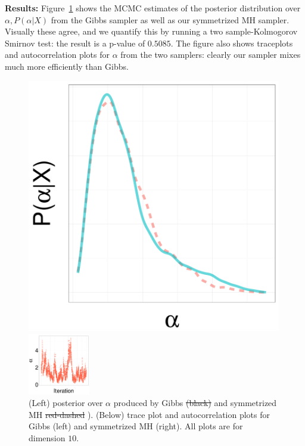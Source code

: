 \noindent \textbf{Results:}
Figure~\ref{fig:TRACE_EXP} shows the MCMC estimates of the posterior distribution over $\alpha, P(\alpha|X)$ from the Gibbs sampler as well as our symmetrized MH sampler. Visually these agree, and we quantify this by running a two sample-Kolmogorov Smirnov test: the result is a p-value of $0.5085$. The figure also shows traceplots and autocorrelation plots for $\alpha$ from the two samplers:
 clearly our sampler mixes much more efficiently than Gibbs.
  \begin{figure}[H]
  \begin{minipage}[!hp]{0.25\linewidth}
    \includegraphics [width=0.99\textwidth, angle=0]{figs/EXP_ks/exp_hist_44_05_10_.pdf}
  \end{minipage}
  \begin{minipage}[!hp]{0.74\linewidth}
    \caption{(Left) posterior over $\alpha$ produced by Gibbs \sout{(black)}  and symmetrized MH \sout{red-dashed} ). (Below) trace plot and autocorrelation plots for Gibbs (left) and symmetrized MH (right). All plots are for dimension $10$. \ \ }
     \label{fig:TRACE_EXP}
  \end{minipage}
  \centering
  \begin{minipage}[!hp]{0.97\linewidth}
    \includegraphics [width=0.24\textwidth, angle=0]{figs/EXP_ks/exp_traceGBS_44_05_10_.pdf}

\end{minipage}
\end{figure}
